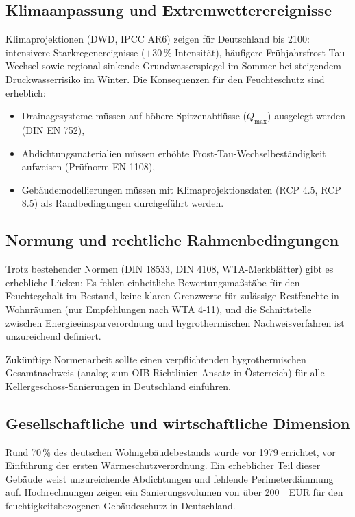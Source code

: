 ﻿\documentclass[a4paper,12pt]{article}
\theoremstyle{definition}
\begin{document}
\subsection{Klimaanpassung und Extremwetterereignisse}

Klimaprojektionen (DWD, IPCC AR6) zeigen f\"ur Deutschland bis 2100:
intensivere Starkregenereignisse ($+30\,\%$ Intensit\"at),
h\"aufigere Fr\"uhjahrsfrost-Tau-Wechsel sowie regional sinkende
Grundwasserspiegel im Sommer bei steigendem Druckwasserrisiko
im Winter. Die Konsequenzen f\"ur den Feuchteschutz sind erheblich:
\begin{itemize}
  \item Drainagesysteme m\"ussen auf h\"ohere Spitzenabfl\"usse ($Q_{\max}$)
        ausgelegt werden (DIN EN 752),
  \item Abdichtungsmaterialien m\"ussen erh\"ohte Frost-Tau-Wechselbest\"andigkeit
        aufweisen (Pr\"ufnorm EN 1108),
  \item Geb\"audemodellierungen m\"ussen mit Klimaprojektionsdaten
        (RCP 4.5, RCP 8.5) als Randbedingungen durchgef\"uhrt werden.
\end{itemize}

\subsection{Normung und rechtliche Rahmenbedingungen}

Trotz bestehender Normen (DIN 18533, DIN 4108, WTA-Merkbl\"atter)
gibt es erhebliche L\"ucken: Es fehlen einheitliche Bewertungsma\ss{}st\"abe
f\"ur den Feuchtegehalt im Bestand, keine klaren Grenzwerte f\"ur
zul\"assige Restfeuchte in Wohnr\"aumen (nur Empfehlungen nach WTA 4-11),
und die Schnittstelle zwischen Energieeinsparverordnung und
hygrothermischen Nachweisverfahren ist unzureichend definiert.

Zuk\"unftige Normenarbeit sollte einen verpflichtenden hygrothermischen
Gesamtnachweis (analog zum OIB-Richtlinien-Ansatz in \"Osterreich)
f\"ur alle Kellergeschoss-Sanierungen in Deutschland einf\"uhren.

\subsection{Gesellschaftliche und wirtschaftliche Dimension}

Rund 70\,\% des deutschen Wohngeb\"audebestands wurde vor 1979 errichtet,
vor Einf\"uhrung der ersten W\"armeschutzverordnung. Ein erheblicher Teil
dieser Geb\"aude weist unzureichende Abdichtungen und fehlende
Perimeterd\"ammung auf. Hochrechnungen zeigen ein Sanierungsvolumen
von \"uber \SI{200}{EUR} f\"ur den feuchtigkeitsbezogenen
Geb\"audeschutz in Deutschland.
\end{document}
